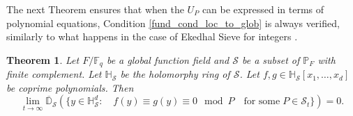 \documentclass[10pt]{amsart}
\newcommand{\vF}{\mathbb{F}}
\newcommand{\vH}{\mathbb{H}}
\newcommand{\vD}{\mathbb{D}}
\newcommand{\vP}{\mathbb{P}}
\newcommand{\cS}{\mathcal{S}}
\newtheorem{theorem}{Theorem}[section]
\theoremstyle{definition}
\theoremstyle{remark}
\numberwithin{equation}{section}
\begin{document}
The next Theorem ensures that when the $U_P$ can be expressed in terms of polynomial equations, Condition \eqref{fund_cond_loc_to_glob} is always verified, similarly to what happens in the case of Ekedhal Sieve for integers \cite{torsten1991infinite}.
\begin{theorem}\label{condition_verified_polynomials_THEOREM}
Let $F/\vF_q$ be a global function field and $\cS$ be a subset of $\vP_F$ with finite complement. Let $\vH_{\cS}$ be the holomorphy ring of $\cS$. Let $f,g \in \vH_{\cS}[x_1,\dots,x_d]$ be coprime polynomials. Then
\begin{equation}\label{condition_verified_polynomials}
\lim_{t\rightarrow \infty} \overline{\vD}_{\cS}\left(\{y\in \vH_{\cS}^d: \quad f(y)\equiv g(y)\equiv 0 \mod P\quad  \text{for some}\; P\in \cS_t\}\right)=0.
\end{equation}
\end{theorem}
\end{document}
